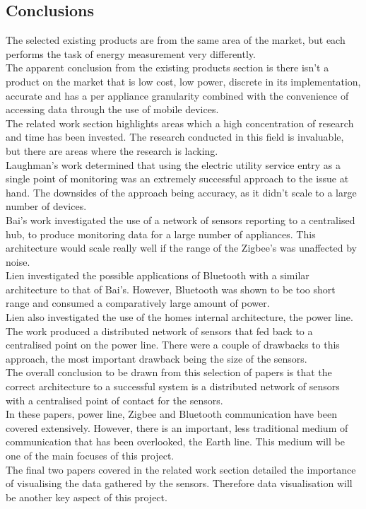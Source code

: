 \documentclass[preprint,12pt,3p]{elsarticle}
\begin{document}
\subsection{Conclusions}
The selected existing products are from the same area of the market, but each performs the task of energy measurement very differently.\\
The apparent conclusion from the existing products section is there isn't a product on the market that is low cost, low power, discrete in its implementation, accurate and has a per appliance granularity combined with the convenience of accessing data through the use of mobile devices.\\
The related work section highlights areas which a high concentration of research and time has been invested. The research conducted in this field is invaluable, but there are areas where the research is lacking.\\
Laughman's work determined that using the electric utility service entry as a single point of monitoring was an extremely successful approach to the issue at hand. The downsides of the approach being accuracy, as it didn't scale to a large number of devices.\\
Bai's work investigated the use of a network of sensors reporting to a centralised hub, to produce monitoring data for a large number of appliances. This architecture would scale really well if the range of the Zigbee's was unaffected by noise.\\
Lien investigated the possible applications of Bluetooth with a similar architecture to that of Bai's. However, Bluetooth was shown to be too short range and consumed a comparatively large amount of power.\\
Lien also investigated the use of the homes internal architecture, the power line. The work produced a distributed network of sensors that fed back to a centralised point on the power line. There were a couple of drawbacks to this approach, the most important drawback being the size of the sensors.\\
The overall conclusion to be drawn from this selection of papers is that the correct architecture to a successful system is a distributed network of sensors with a centralised point of contact for the sensors.\\
In these papers, power line, Zigbee and Bluetooth communication have been covered extensively. However, there is an important, less traditional medium of communication that has been overlooked, the Earth line. This medium will be one of the main focuses of this project.\\
The final two papers covered in the related work section detailed the importance of visualising the data gathered by the sensors. Therefore data visualisation will be another key aspect of this project.
\end{document}
